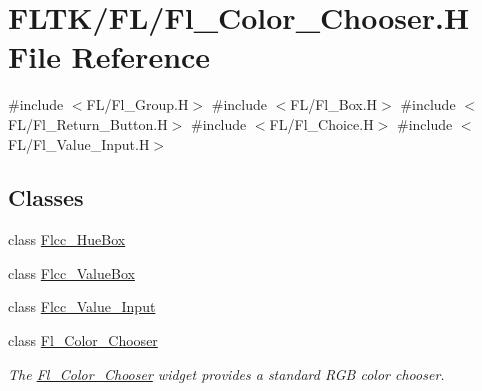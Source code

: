 \hypertarget{_fl___color___chooser_8_h}{}\section{F\+L\+T\+K/\+F\+L/\+Fl\+\_\+\+Color\+\_\+\+Chooser.H File Reference}
\label{_fl___color___chooser_8_h}
{\ttfamily \#include $<$F\+L/\+Fl\+\_\+\+Group.\+H$>$}\newline
{\ttfamily \#include $<$F\+L/\+Fl\+\_\+\+Box.\+H$>$}\newline
{\ttfamily \#include $<$F\+L/\+Fl\+\_\+\+Return\+\_\+\+Button.\+H$>$}\newline
{\ttfamily \#include $<$F\+L/\+Fl\+\_\+\+Choice.\+H$>$}\newline
{\ttfamily \#include $<$F\+L/\+Fl\+\_\+\+Value\+\_\+\+Input.\+H$>$}\newline
\subsection*{Classes}
\begin{DoxyCompactItemize}
\item 
class \hyperlink{class_flcc___hue_box}{Flcc\+\_\+\+Hue\+Box}
\item 
class \hyperlink{class_flcc___value_box}{Flcc\+\_\+\+Value\+Box}
\item 
class \hyperlink{class_flcc___value___input}{Flcc\+\_\+\+Value\+\_\+\+Input}
\item 
class \hyperlink{class_fl___color___chooser}{Fl\+\_\+\+Color\+\_\+\+Chooser}
\begin{DoxyCompactList}\small\item\em The \hyperlink{class_fl___color___chooser}{Fl\+\_\+\+Color\+\_\+\+Chooser} widget provides a standard R\+GB color chooser. \end{DoxyCompactList}\end{DoxyCompactItemize}
